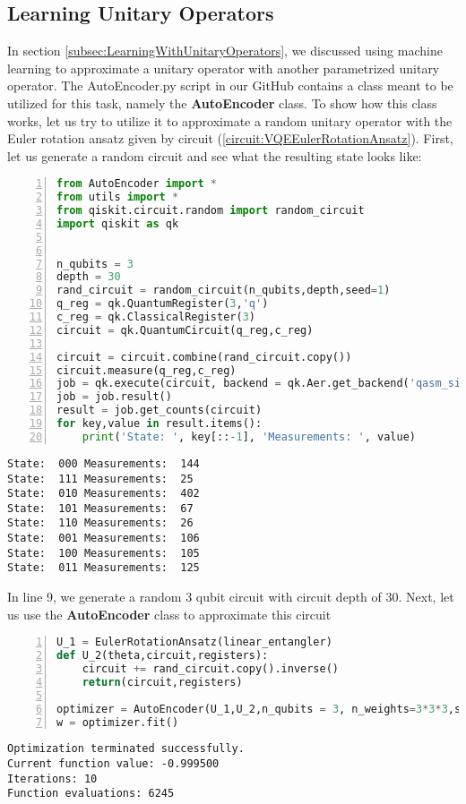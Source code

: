 \subsection{Learning Unitary Operators}
In section \ref{subsec:LearningWithUnitaryOperators}, we discussed using machine learning to approximate a unitary operator with another parametrized unitary operator. The AutoEncoder.py script in our GitHub contains a class meant to be utilized for this task, namely the \textbf{AutoEncoder} class. To show how this class works, let us try to utilize it to approximate a random unitary operator with the Euler rotation ansatz given by circuit (\ref{circuit:VQEEulerRotationAnsatz}). First, let us generate a random circuit and see what the resulting state looks like:
\begin{lstlisting}[language=Python,numbers=left]
from AutoEncoder import *
from utils import *
from qiskit.circuit.random import random_circuit
import qiskit as qk


n_qubits = 3
depth = 30
rand_circuit = random_circuit(n_qubits,depth,seed=1)
q_reg = qk.QuantumRegister(3,'q')
c_reg = qk.ClassicalRegister(3)
circuit = qk.QuantumCircuit(q_reg,c_reg)

circuit = circuit.combine(rand_circuit.copy())
circuit.measure(q_reg,c_reg)
job = qk.execute(circuit, backend = qk.Aer.get_backend('qasm_simulator'),seed_simulator=42,shots=1000)
job = job.result()
result = job.get_counts(circuit)
for key,value in result.items():
    print('State: ', key[::-1], 'Measurements: ', value)
\end{lstlisting}
\begin{verbatim}
State:  000 Measurements:  144
State:  111 Measurements:  25
State:  010 Measurements:  402
State:  101 Measurements:  67
State:  110 Measurements:  26
State:  001 Measurements:  106
State:  100 Measurements:  105
State:  011 Measurements:  125
\end{verbatim}
In line 9, we generate a random 3 qubit circuit with circuit depth of 30.
Next, let us use the \textbf{AutoEncoder} class to approximate this circuit
\begin{lstlisting}[language=Python,numbers=left]
U_1 = EulerRotationAnsatz(linear_entangler)
def U_2(theta,circuit,registers):
	circuit += rand_circuit.copy().inverse()
	return(circuit,registers)

optimizer = AutoEncoder(U_1,U_2,n_qubits = 3, n_weights=3*3*3,shots=10000,seed_simulator=42)
w = optimizer.fit()
\end{lstlisting}
\begin{verbatim}
Optimization terminated successfully.
Current function value: -0.999500
Iterations: 10
Function evaluations: 6245
\end{verbatim}
